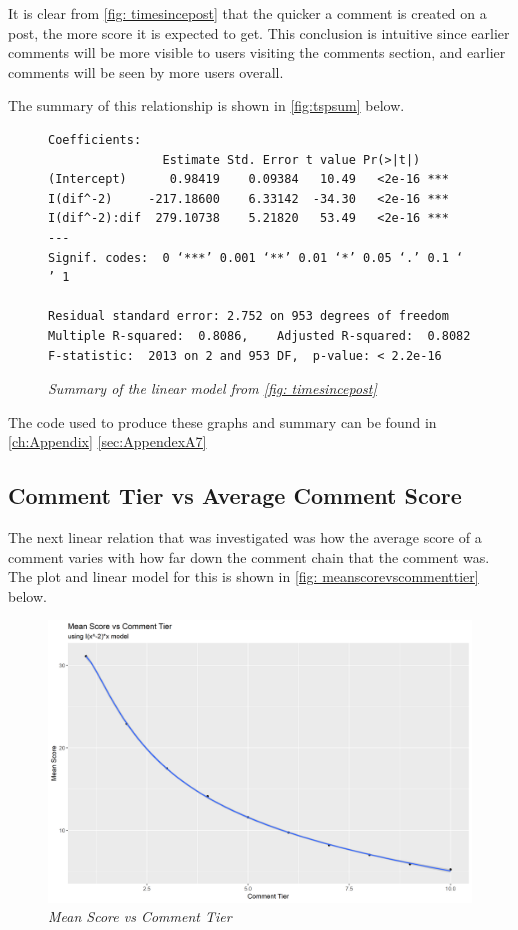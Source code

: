 It is clear from \autoref{fig: timesincepost} that the quicker a comment is created on a post, the more score it is expected to get. This conclusion is intuitive since earlier comments will be more visible to users visiting the comments section, and earlier comments will be seen by more users overall.

The summary of this relationship is shown in \autoref{fig:tspsum} below.

\begin{figure}[H]
    \begin{lstlisting}
Coefficients:
                Estimate Std. Error t value Pr(>|t|)    
(Intercept)      0.98419    0.09384   10.49   <2e-16 ***
I(dif^-2)     -217.18600    6.33142  -34.30   <2e-16 ***
I(dif^-2):dif  279.10738    5.21820   53.49   <2e-16 ***
---
Signif. codes:  0 ‘***’ 0.001 ‘**’ 0.01 ‘*’ 0.05 ‘.’ 0.1 ‘ ’ 1

Residual standard error: 2.752 on 953 degrees of freedom
Multiple R-squared:  0.8086,	Adjusted R-squared:  0.8082 
F-statistic:  2013 on 2 and 953 DF,  p-value: < 2.2e-16
    \end{lstlisting}
    \caption{\textit{Summary of the linear model from \autoref{fig: timesincepost}}}
    \label{fig:tspsum}
    \end{figure}

The code used to produce these graphs and summary can be found in \autoref{ch:Appendix} \autoref{sec:AppendexA7}

\subsection {Comment Tier vs Average Comment Score}
The next linear relation that was investigated was how the average score of a comment varies with how far down the comment chain that the comment was. The plot and linear model for this is shown in \autoref{fig: meanscorevscommenttier} below.

 \begin{figure}[H]
        \centering
        \includegraphics[width=1.0\textwidth]{graphs/meanscorevscommenttier.png}
        \caption{\textit{Mean Score vs Comment Tier}}
        \label{fig: meanscorevscommenttier}
    \end{figure}


